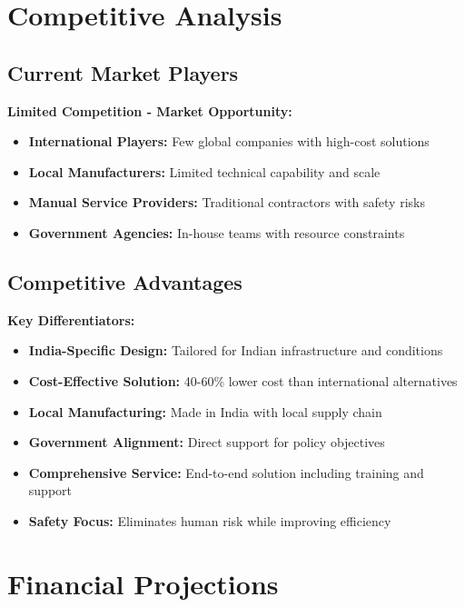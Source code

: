 \documentclass[11pt,a4paper]{article}
\begin{document}
\section{Competitive Analysis}

\subsection{Current Market Players}
\begin{warning}
\textbf{Limited Competition - Market Opportunity:}
\begin{itemize}
    \item \textbf{International Players:} Few global companies with high-cost solutions
    \item \textbf{Local Manufacturers:} Limited technical capability and scale
    \item \textbf{Manual Service Providers:} Traditional contractors with safety risks
    \item \textbf{Government Agencies:} In-house teams with resource constraints
\end{itemize}
\end{warning}

\subsection{Competitive Advantages}
\begin{success}
\textbf{Key Differentiators:}
\begin{itemize}
    \item \textbf{India-Specific Design:} Tailored for Indian infrastructure and conditions
    \item \textbf{Cost-Effective Solution:} 40-60\% lower cost than international alternatives
    \item \textbf{Local Manufacturing:} Made in India with local supply chain
    \item \textbf{Government Alignment:} Direct support for policy objectives
    \item \textbf{Comprehensive Service:} End-to-end solution including training and support
    \item \textbf{Safety Focus:} Eliminates human risk while improving efficiency
\end{itemize}
\end{success}

\section{Financial Projections}
\end{document}

